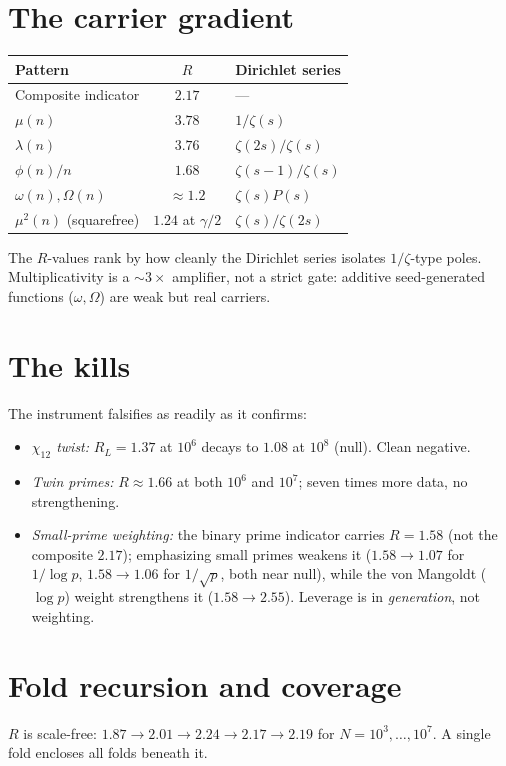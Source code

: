 \documentclass[11pt]{amsart}
\theoremstyle{remark}
\begin{document}
\section{The carrier gradient}
\begin{center}
\begin{tabular}{lcl}
Pattern & $R$ & Dirichlet series \\ \hline
Composite indicator & $2.17$ & --- \\
$\mu(n)$ & $3.78$ & $1/\zeta(s)$ \\
$\lambda(n)$ & $3.76$ & $\zeta(2s)/\zeta(s)$ \\
$\phi(n)/n$ & $1.68$ & $\zeta(s-1)/\zeta(s)$ \\
$\omega(n),\Omega(n)$ & $\approx1.2$ & $\zeta(s)P(s)$ \\
$\mu^2(n)$ (squarefree) & $1.24$ at $\gamma/2$ & $\zeta(s)/\zeta(2s)$
\end{tabular}
\end{center}
The $R$-values rank by how cleanly the Dirichlet series isolates
$1/\zeta$-type poles.  Multiplicativity is a $\sim3\times$
amplifier, not a strict gate: additive seed-generated functions
($\omega,\Omega$) are weak but real carriers.

\section{The kills}
The instrument falsifies as readily as it confirms:
\begin{itemize}
\item \emph{$\chi_{12}$ twist:} $R_L=1.37$ at $10^6$ decays to
$1.08$ at $10^8$ (null).  Clean negative.
\item \emph{Twin primes:} $R\approx1.66$ at both $10^6$ and $10^7$;
seven times more data, no strengthening.
\item \emph{Small-prime weighting:} the binary prime indicator
carries $R=1.58$ (not the composite $2.17$); emphasizing small
primes weakens it ($1.58\to1.07$ for $1/\log p$, $1.58\to1.06$
for $1/\sqrt p$, both near null), while the von Mangoldt
($\log p$) weight strengthens it ($1.58\to2.55$).  Leverage is
in \emph{generation}, not weighting.
\end{itemize}

\section{Fold recursion and coverage}
$R$ is scale-free: $1.87\to2.01\to2.24\to2.17\to2.19$ for
$N=10^3,\dots,10^7$.  A single fold encloses all folds beneath it.
\end{document}
